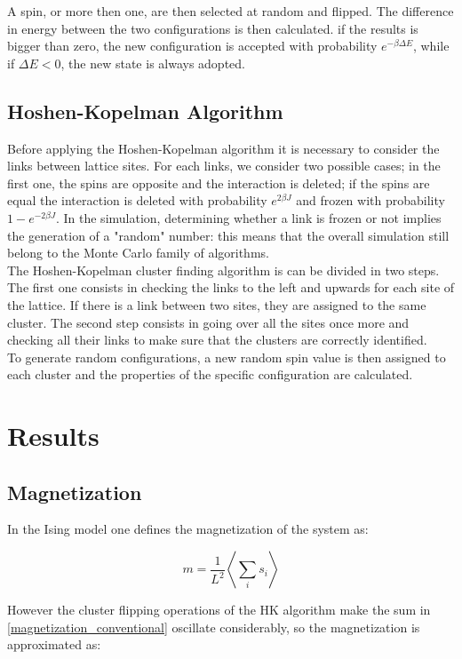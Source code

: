 \documentclass[twoside]{article}
\def\mean#1{\left< #1 \right>}
\begin{document}
\begin{multicols}{2}
A spin, or more then one, are then selected at random and flipped. The difference in energy between the two configurations is then calculated. if the results is bigger than zero, the new configuration is accepted with probability $e^{-\beta\Delta E}$, while if $\Delta E < 0$, the new state is always adopted.

\subsection{Hoshen-Kopelman Algorithm}
Before applying the Hoshen-Kopelman algorithm it is necessary to consider the links between lattice sites. For each links, we consider two possible cases; in the first one, the spins are opposite and the interaction is deleted; if the spins are equal the interaction is deleted with probability $e^{2\beta J}$ and frozen with probability $1-e^{-2\beta J}$.
In the simulation, determining whether a link is frozen or not implies the generation of a "random" number: this means that the overall simulation still belong to the Monte Carlo family of algorithms. \\
The Hoshen-Kopelman cluster finding algorithm is can be divided in two steps.
The first one consists in checking the links to the left and upwards for each site of the lattice. If there is a link between two sites, they are assigned to the same cluster. The second step consists in going over all the sites once more and checking all their links to make sure that the clusters are correctly identified. \\ To generate random configurations, a new random spin value is then assigned to each cluster and the properties of the specific configuration are calculated.

\section{Results}

\subsection{Magnetization}
In the Ising model one defines the magnetization of the system as:

\begin{equation}
m = \frac{1}{L^2} \mean{\sum_i s_i}
\label{magnetization_conventional}
\end{equation}

However the cluster flipping operations of the HK algorithm make the sum in \ref{magnetization_conventional} oscillate considerably, so the magnetization is approximated as:


\end{multicols}
\end{document}
